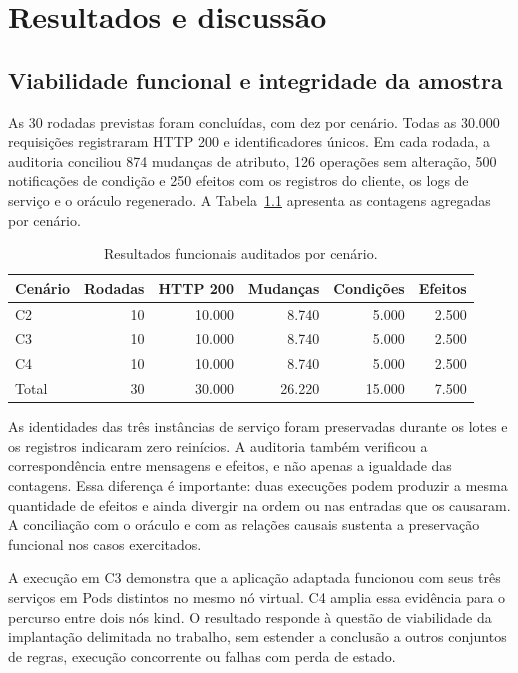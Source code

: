\chapter{Resultados e discussão}
\label{cap:resultados-e11}

\section{Viabilidade funcional e integridade da amostra}

As 30 rodadas previstas foram concluídas, com dez por cenário. Todas as 30.000 requisições registraram HTTP 200 e identificadores únicos. Em cada rodada, a auditoria conciliou 874 mudanças de atributo, 126 operações sem alteração, 500 notificações de condição e 250 efeitos com os registros do cliente, os logs de serviço e o oráculo regenerado. A Tabela~\ref{tab:resultado-funcional} apresenta as contagens agregadas por cenário.

\begin{table}[htbp]
\centering\small
\caption{Resultados funcionais auditados por cenário.}
\label{tab:resultado-funcional}
\begin{tabular}{@{}lrrrrr@{}}
\toprule
Cenário & Rodadas & HTTP 200 & Mudanças & Condições & Efeitos \\
\midrule
C2 & 10 & 10.000 & 8.740 & 5.000 & 2.500 \\
C3 & 10 & 10.000 & 8.740 & 5.000 & 2.500 \\
C4 & 10 & 10.000 & 8.740 & 5.000 & 2.500 \\
\midrule
Total & 30 & 30.000 & 26.220 & 15.000 & 7.500 \\
\bottomrule
\end{tabular}
\end{table}

As identidades das três instâncias de serviço foram preservadas durante os lotes e os registros indicaram zero reinícios. A auditoria também verificou a correspondência entre mensagens e efeitos, e não apenas a igualdade das contagens. Essa diferença é importante: duas execuções podem produzir a mesma quantidade de efeitos e ainda divergir na ordem ou nas entradas que os causaram. A conciliação com o oráculo e com as relações causais sustenta a preservação funcional nos casos exercitados.

A execução em C3 demonstra que a aplicação adaptada funcionou com seus três serviços em Pods distintos no mesmo nó virtual. C4 amplia essa evidência para o percurso entre dois nós kind. O resultado responde à questão de viabilidade da implantação delimitada no trabalho, sem estender a conclusão a outros conjuntos de regras, execução concorrente ou falhas com perda de estado.

